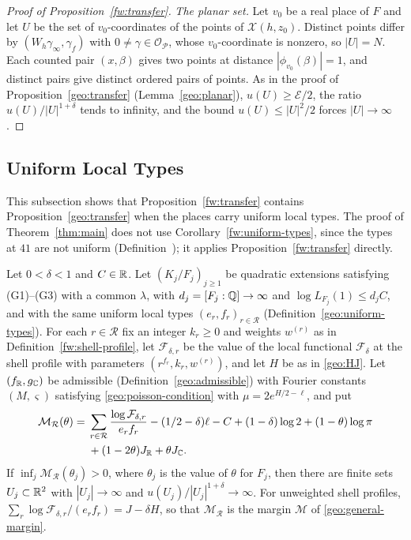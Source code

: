 \begin{proof}[Proof of Proposition~\ref{fw:transfer}]
\emph{The planar set.} Let $v_0$ be a real place of $F$ and let $U$ be
the set of $v_0$-coordinates of the points of $\mathcal X(h,z_0)$.
Distinct points differ by $(W_h\gamma_\infty,\gamma_f)$ with
$0\ne\gamma\in\mathcal O_{\mathcal P}$, whose $v_0$-coordinate is nonzero, so $|U|=N$.
Each counted pair $(x,\beta)$ gives two points at distance
$|\phi_{v_0}(\beta)|=1$, and distinct pairs give distinct ordered
pairs of points. As in the proof of Proposition~\ref{geo:transfer}
(Lemma~\ref{geo:planar}), $u(U)\ge\mathcal E/2$, the ratio
$u(U)/|U|^{1+\delta}$ tends to infinity, and the bound $u(U)\le|U|^2/2$
forces $|U|\to\infty$.
\end{proof}

\subsection{Uniform Local Types}

This subsection shows that Proposition~\ref{fw:transfer} contains
Proposition~\ref{geo:transfer} when the places carry uniform local types. The
proof of Theorem~\ref{thm:main} does not use Corollary~\ref{fw:uniform-types},
since the types at $41$ are not uniform
(Definition~); it applies
Proposition~\ref{fw:transfer} directly.

\begin{corollary}\label{fw:uniform-types}
Let $0<\delta<1$ and $C\in\mathbb R$. Let $(K_j/F_j)_{j\ge1}$ be quadratic
extensions satisfying (G1)--(G3) with a common $\lambda$, with
$d_j=[F_j:\mathbb Q]\to\infty$ and $\log L_{F_j}(1)\le d_jC$, and with the same
uniform local types $(e_r,f_r)_{r\in\mathcal R}$
(Definition~\ref{geo:uniform-types}). For each $r\in\mathcal R$ fix an
integer $k_r\ge0$ and weights $w^{(r)}$ as in
Definition~\ref{fw:shell-profile}, let $\mathcal F_{\delta,r}$ be the
value of the local functional $\mathcal F_\delta$ at the shell profile
with parameters $(r^{f_r},k_r,w^{(r)})$, and let $H$ be as in
\eqref{geo:HJ}. Let $(f_\mathbb R,g_\mathbb C)$ be admissible (Definition~\ref{geo:admissible}) with Fourier constants
$(M,\varsigma)$ satisfying \eqref{geo:poisson-condition} with
$\mu=2e^{H/2-\ell}$, and put
\[
 \begin{split}
 \mathcal M_{\mathcal R}(\theta)={}&
 \sum_{r\in\mathcal R}\frac{\log\mathcal F_{\delta,r}}{e_rf_r}
 -(1/2-\delta)\ell-C+(1-\delta)\log2+(1-\theta)\log\pi\\
 &+(1-2\theta)J_\mathbb R+\theta J_\mathbb C .
 \end{split}
\]
If $\inf_j\mathcal M_{\mathcal R}(\theta_j)>0$, where $\theta_j$ is the
value of $\theta$ for $F_j$, then there are finite sets
$U_j\subset\mathbb R^2$ with $|U_j|\to\infty$ and
$u(U_j)/|U_j|^{1+\delta}\to\infty$. For unweighted shell profiles,
$\sum_r\log\mathcal F_{\delta,r}/(e_rf_r)=J-\delta H$, so that
$\mathcal M_{\mathcal R}$ is the margin $\mathcal M$ of
\eqref{geo:general-margin}.
\end{corollary}

